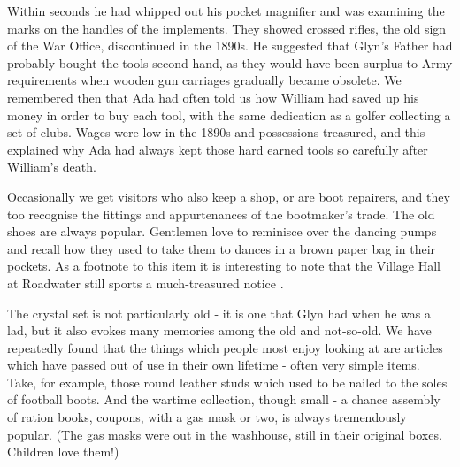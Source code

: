 Within seconds he had whipped out his pocket magnifier and was examining the marks on the handles of the implements. They showed crossed rifles, the old sign of the War Office, discontinued in the 1890s. He suggested that Glyn's Father had probably bought the tools second hand, as they would have been surplus to Army requirements when wooden gun carriages gradually became obsolete. We remembered then that Ada had often told us how William had saved up his money in order to buy each tool, with the same dedication as a golfer collecting a set of clubs. Wages were low in the 1890s and possessions treasured, and this explained why Ada had always kept those hard earned tools so carefully after William's death.

Occasionally we get visitors who also keep a shop, or are boot repairers, and they too recognise the fittings and appurtenances of the bootmaker's trade. The old shoes are always popular. Gentlemen love to reminisce over the dancing pumps and recall how they used to take them to dances in a brown paper bag in their pockets. As a footnote to this item it is interesting to note that the Village Hall at Roadwater still sports a much-treasured notice .

The crystal set is not particularly old - it is one that Glyn had when he was a lad, but it also evokes many memories among the old and not-so-old. We have repeatedly found that the things which people most enjoy looking at are articles which have passed out of use in their own lifetime - often very simple items. Take, for example, those round leather studs which used to be nailed to the soles of football boots. And the wartime collection, though small - a chance assembly of ration books, coupons, with a gas mask or two, is always tremendously popular. (The gas masks were out in the washhouse, still in their original boxes. Children love them!)

